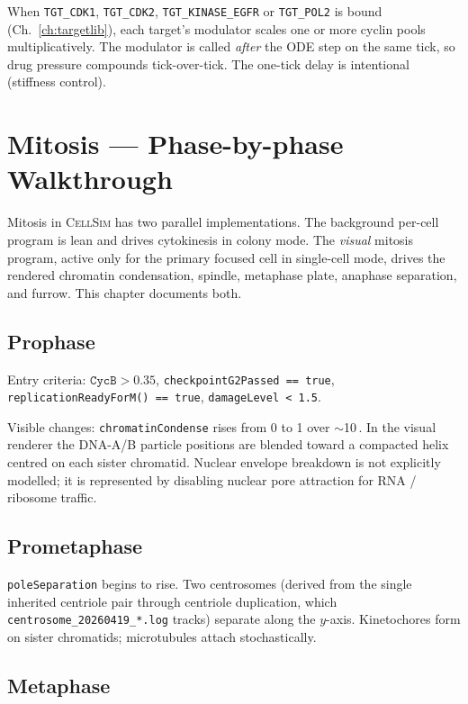 \documentclass[11pt,letterpaper,twoside,openany]{book}
\newcommand{\code}[1]{\texttt{#1}}
\newcommand{\biomin}{\text{bio-min}}
\begin{document}
When \code{TGT\_CDK1}, \code{TGT\_CDK2}, \code{TGT\_KINASE\_EGFR} or
\code{TGT\_POL2} is bound (Ch.~\ref{ch:targetlib}), each target's
modulator scales one or more cyclin pools multiplicatively. The
modulator is called \emph{after} the ODE step on the same tick, so
drug pressure compounds tick-over-tick. The one-tick delay is
intentional (stiffness control).

\chapter{Mitosis --- Phase-by-phase Walkthrough}
\label{ch:mitosis-deep}

Mitosis in \textsc{CellSim} has two parallel implementations. The
background per-cell program is lean and drives cytokinesis in
colony mode. The \emph{visual} mitosis program, active only for the
primary focused cell in single-cell mode, drives the rendered
chromatin condensation, spindle, metaphase plate, anaphase
separation, and furrow. This chapter documents both.

\section{Prophase}

Entry criteria: $\code{CycB} > 0.35$, \code{checkpointG2Passed ==
true}, \code{replicationReadyForM() == true},
\code{damageLevel < 1.5}.

Visible changes: \code{chromatinCondense} rises from 0 to 1 over
$\sim$10\,\biomin. In the visual renderer the DNA-A/B particle
positions are blended toward a compacted helix centred on each
sister chromatid. Nuclear envelope breakdown is not explicitly
modelled; it is represented by disabling nuclear pore attraction
for RNA / ribosome traffic.

\section{Prometaphase}

\code{poleSeparation} begins to rise. Two centrosomes (derived from
the single inherited centriole pair through centriole duplication,
which \code{centrosome\_20260419\_*.log} tracks) separate along the
$y$-axis. Kinetochores form on sister chromatids; microtubules
attach stochastically.

\section{Metaphase}
\end{document}
